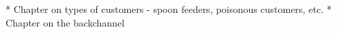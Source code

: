* Chapter on types of customers - spoon feeders, poisonous customers, etc.
* Chapter on the backchannel
